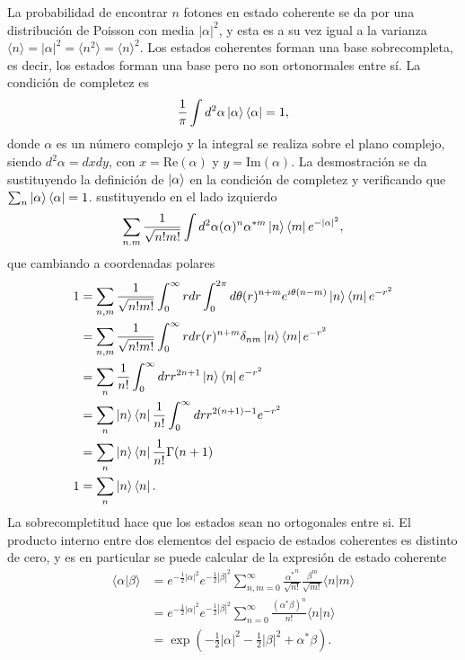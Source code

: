 La probabilidad de encontrar $n$ fotones en estado coherente se da por una distribución de Poisson con media $|\alpha|^2$, y esta es a su vez igual a la varianza $\langle n \rangle = |\alpha|^2 = \langle n^2 \rangle = \langle n \rangle^2$.
Los estados coherentes forman una base sobrecompleta, es decir, los estados forman una base pero no son ortonormales entre sí. La condición de completez es
\begin{equation*}
  \frac{1}{\pi}\int d^2 \alpha \ket{\alpha}\bra{\alpha} = 1,
\end{equation*}
donde $\alpha$ es un número complejo y la integral se realiza sobre el plano complejo, siendo $d^2\alpha = dxdy$, con $x = \mathrm{Re}(\alpha)$ y $y = \mathrm{Im}(\alpha)$. La desmostración se da sustituyendo la definición de $\ket{\alpha}$ en la condición de completez y verificando que $\sum_n \ket{\alpha}\bra{\alpha}=1$. sustituyendo en el lado izquierdo
\begin{equation*}
  \sum_{n.m} \frac{1}{\sqrt{n!m!}}\int d^2\alpha (\alpha)^n \alpha^{*m}\ket{n}\bra{m}e^{-|\alpha|^2},
\end{equation*}
que cambiando a coordenadas polares
\begin{align*}
  1 & = \sum_{n,m}\frac{1}{\sqrt{n!m!}}\int_0^{\infty} rdr \int_{0}^{2\pi}d\theta (r)^{n+m}e^{i\theta(n-m)}\ket{n}\bra{m}e^{-r^2} \\ & = \sum_{n,m}\frac{1}{\sqrt{n!m!}}\int_0^{\infty} rdr  (r)^{n+m} \delta_{nm} \ket{n}\bra{m}e^{-r^2} \\
    & = \sum_{n}\frac{1}{n!}\int_0^{\infty} dr  r^{2n+1} \ket{n}\bra{n}e^{-r^2}                                                   \\
    & = \sum_{n} \ket{n}\bra{n} \frac{1}{n!}\int_0^{\infty} dr  r^{2(n+1)-1} e^{-r^2}                                             \\
    & = \sum_{n} \ket{n}\bra{n} \frac{1}{n!} \Gamma(n+1)                                                                          \\
  1 & = \sum_{n} \ket{n}\bra{n}.
\end{align*}
La sobrecompletitud hace que los estados sean no ortogonales entre si. El producto interno entre dos elementos del espacio de estados coherentes es distinto de cero, y es en particular se puede calcular de la expresión de estado coherente
\begin{align*}
  \langle\alpha\vert\beta\rangle & = e^{-\frac{1}{2}|\alpha|^2} e^{-\frac{1}{2}|\beta|^2} \sum_{n,m=0}^{\infty} \frac{{\alpha^*}^n}{\sqrt{n!}}\frac{\beta^m}{\sqrt{m!}} \langle n\vert m \rangle \\
                                 & = e^{-\frac{1}{2}|\alpha|^2} e^{-\frac{1}{2}|\beta|^2} \sum_{n=0}^{\infty} \frac{{(\alpha^*\beta)}^n}{n!} \langle n \vert n\rangle                            \\
                                 & = \exp{\left( - \frac{1}{2}|\alpha|^2 - \frac{1}{2}|\beta|^2 + \alpha^*\beta \right)}.
\end{align*}

